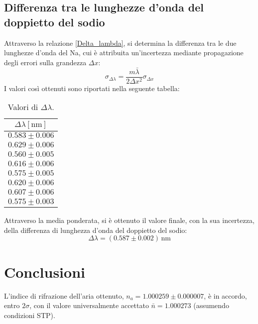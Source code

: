 \documentclass[]{article}
\let\oldsection\section%
\renewcommand{\section}{%
	\renewcommand{\theequation}{\thesection.\arabic{equation}}%
	\oldsection}%
\let\oldsubsection\subsection%
\renewcommand{\subsection}{%
	\renewcommand{\theequation}{\thesubsection.\arabic{equation}}%
	\oldsubsection}%
\begin{document}
\subsection{Differenza tra le lunghezze d'onda del doppietto del sodio}
Attraverso la relazione \ref{Delta_lambda}, si determina la differenza tra le due lunghezze d'onda del Na, cui è attribuita un'incertezza mediante propagazione degli errori sulla grandezza $\Delta x$:
\begin{equation}
    \label{sigma-delta-lambda}
    \sigma_{\Delta \lambda} = \frac{m \bar{\lambda}}{2 \Delta x ^2} \sigma_{\Delta x}
\end{equation}
I valori così ottenuti sono riportati nella seguente tabella:
\begin{table}[H]
    \centering
    \begin{tabular}{||c||}
        \hline
        $\Delta \lambda [\text{nm}]$ \\
        \hline\hline

        $0.583 \pm 0.006$ \\\hline
        $0.629 \pm 0.006$ \\\hline
        $0.560 \pm 0.005$ \\\hline
        $0.616 \pm 0.006$ \\\hline
        $0.575 \pm 0.005$ \\\hline
        $0.620 \pm 0.006$ \\\hline
        $0.607 \pm 0.006$ \\\hline
        $0.575 \pm 0.003$ \\\hline
    
    \end{tabular}
    \caption{Valori di $\Delta \lambda$.}
    \label{tab:delta-lambda}
\end{table}
Attraverso la media ponderata, si è ottenuto il valore finale, con la sua incertezza, della differenza di lunghezza d'onda del doppietto del sodio:
\begin{equation}
    \label{delta-lambda-value}
    \Delta \lambda = (0.587 \pm 0.002) \, \text{nm}
\end{equation}

\section{Conclusioni}
L'indice di rifrazione dell'aria ottenuto, $n_a=1.000259 \pm 0.000007$, è in accordo, entro $2 \sigma$, con il valore universalmente accettato $\bar{n}=1.000273$ (assumendo condizioni STP).
\end{document}
